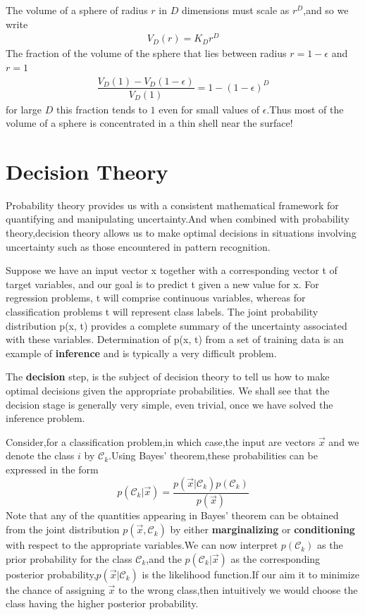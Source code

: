 The volume of a sphere of radius $r$ in $D$ dimensions must scale as $r^D$,and so we write
\begin{align}
V_D(r) = K_D r^D
\end{align}
The fraction of the volume of the sphere that lies between radius $r=1-\epsilon$ and $r=1$
\begin{align}
\dfrac{V_D(1)-V_D(1-\epsilon)}{V_D(1)}=1-(1-\epsilon)^D
\end{align}
for large $D$ this fraction tends to $1$ even for small values of $\epsilon$.Thus most of the volume of a sphere is concentrated in a thin shell near the surface!

\section{Decision Theory}
Probability theory provides us with a consistent mathematical framework for quantifying and manipulating uncertainty.And when combined with probability theory,decision theory allows us to make optimal decisions in situations involving uncertainty such as those encountered in pattern recognition.

Suppose we have an input vector x together with a corresponding vector t of target variables, and our goal is to predict t given a new value for x. For regression problems, t will comprise continuous variables, whereas for classification problems t will represent class labels. The joint probability distribution p(x, t) provides a complete summary of the uncertainty associated with these variables. Determination of p(x, t) from a set of training data is an example of \textbf{inference} and is typically a very difficult problem.

The \textbf{decision} step, is the subject of decision theory to tell us how to make optimal decisions given the appropriate probabilities. We shall see that the decision stage is generally very simple, even trivial, once we have solved the inference problem.

Consider,for a classification problem,in which case,the input are vectors  $\vec{x}$ and we denote the class $i$ by $\mathcal{C}_k$.Using Bayes' theorem,these probabilities can be expressed in the form
\begin{equation}
p(\mathcal{C}_k|\vec{x}) = \dfrac{p(\vec{x}|\mathcal{C}_k)p(\mathcal{C}_k)}{p(\vec{x})}
\end{equation}
Note that any of the quantities appearing in Bayes' theorem can be obtained from the joint distribution $p(\vec{x},\mathcal{C}_k)$ by either \textbf{marginalizing} or \textbf{conditioning} with respect to the appropriate variables.We can now interpret $p(\mathcal{C}_k)$ as the prior probability for the class $\mathcal{C}_k$,and the $p(\mathcal{C}_k|\vec{x})$ as the corresponding posterior probability,$p(\vec{x}|\mathcal{C}_k)$ is the likelihood function.If our aim it to minimize the chance of assigning $\vec{x}$ to the wrong class,then intuitively we would choose the class having the higher posterior probability.
